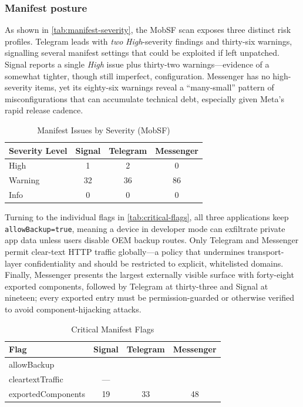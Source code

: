 \documentclass[a4paper,12pt]{report}
\newcommand{\cmark}{\ding{51}} %
\begin{document}
\subsubsection{Manifest posture}
As shown in \autoref{tab:manifest-severity}, the MobSF scan exposes three distinct risk profiles.
Telegram leads with \emph{two} \emph{High}-severity findings and thirty-six warnings, signalling several manifest settings that could be exploited if left unpatched.
Signal reports a single \emph{High} issue plus thirty-two warnings—evidence of a somewhat tighter, though still imperfect, configuration.
Messenger has no high-severity items, yet its eighty-six warnings reveal a “many-small” pattern of misconfigurations that can accumulate technical debt, especially given Meta’s rapid release cadence.

\begin{table}[htbp]
  \centering
  \caption{Manifest Issues by Severity (MobSF)}
  \label{tab:manifest-severity}
  \begin{tabular}{|l|c|c|c|}
    \hline
    \textbf{Severity Level} & \textbf{Signal} & \textbf{Telegram} & \textbf{Messenger} \\ \hline
    High      & 1  & 2  & 0  \\ \hline
    Warning   & 32 & 36 & 86 \\ \hline
    Info      & 0  & 0  & 0  \\ \hline
  \end{tabular}
\end{table}

Turning to the individual flags in \autoref{tab:critical-flags}, all three applications keep \lstinline{allowBackup=true}, meaning a device in developer mode can exfiltrate private app data unless users disable OEM backup routes. Only Telegram and Messenger permit clear-text HTTP traffic globally—a policy that undermines transport-layer confidentiality and should be restricted to explicit, whitelisted domains. Finally, Messenger presents the largest externally visible surface with forty-eight exported components, followed by Telegram at thirty-three and Signal at nineteen; every exported entry must be permission-guarded or otherwise verified to avoid component-hijacking attacks.
\begin{table}[htbp]
  \centering
  \caption{Critical Manifest Flags}
  \label{tab:critical-flags}
  \begin{tabular}{|l|c|c|c|}
    \hline
    \textbf{Flag} & \textbf{Signal} & \textbf{Telegram} & \textbf{Messenger} \\ \hline
    allowBackup        & \cmark & \cmark & \cmark \\ \hline
    cleartextTraffic   & —      & \cmark & \cmark \\ \hline
    exportedComponents & 19     & 33     & 48     \\ \hline
  \end{tabular}
\end{table}
\end{document}

